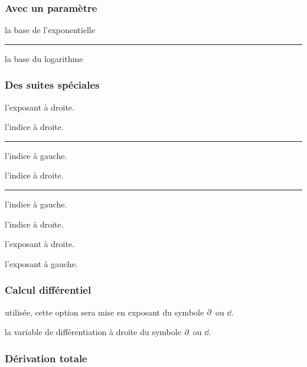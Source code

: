 \documentclass[12pt,a4paper]{article}
\theoremstyle{definition}
\newcommand\separation{
	\medskip
	\hfill\rule{0.5\textwidth}{0.75pt}\hfill
	\medskip
}
\begin{document}
\subsubsection{Avec un paramètre}




\IDarg{} la base de l'exponentielle

\separation


\IDarg{} la base du logarithme



\subsubsection{Des suites spéciales}


 l'exposant à droite.

 l'indice à droite.


\separation



 l'indice à gauche.

 l'indice à droite.


\separation



 l'indice à gauche.

 l'indice à droite.

 l'exposant à droite.

 l'exposant à gauche.
\subsubsection{Calcul différentiel}



\IDoption{} utilisée, cette option sera mise en exposant du symbole $\pp{}$ ou $\dd{}$.

\IDarg{} la variable de différentiation à droite du symbole $\pp{}$ ou $\dd{}$.





\subsubsection{Dérivation totale}
\end{document}
